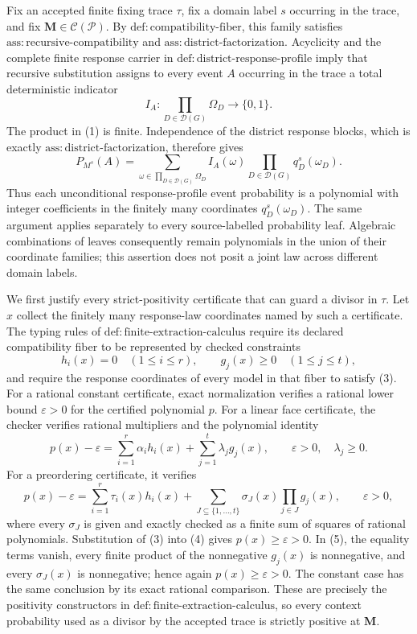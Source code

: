 Fix an accepted finite fixing trace \(\tau\), fix a domain label \(s\) occurring in the trace, and fix \(\mathbf M\in\mathcal C(\mathcal P)\).  By \(\mathrm{def:compatibility\text{-}fiber}\), this family satisfies \(\mathrm{ass:recursive\text{-}compatibility}\) and \(\mathrm{ass:district\text{-}factorization}\).  Acyclicity and the complete finite response carrier in \(\mathrm{def:district\text{-}response\text{-}profile}\) imply that recursive substitution assigns to every event \(A\) occurring in the trace a total deterministic indicator
\[
 I_A:\prod_{D\in\mathcal D(G)}\Omega_D\longrightarrow\{0,1\}.
\tag{1}
\]
The product in (1) is finite.  Independence of the district response blocks, which is exactly \(\mathrm{ass:district\text{-}factorization}\), therefore gives
\[
 P_{M^s}(A)
 =\sum_{\omega\in\prod_{D\in\mathcal D(G)}\Omega_D}
 I_A(\omega)\prod_{D\in\mathcal D(G)}q_D^s(\omega_D).
\tag{2}
\]
Thus each unconditional response-profile event probability is a polynomial with integer coefficients in the finitely many coordinates \(q_D^s(\omega_D)\).  The same argument applies separately to every source-labelled probability leaf.  Algebraic combinations of leaves consequently remain polynomials in the union of their coordinate families; this assertion does not posit a joint law across different domain labels.

We first justify every strict-positivity certificate that can guard a divisor in \(\tau\).  Let \(x\) collect the finitely many response-law coordinates named by such a certificate.  The typing rules of \(\mathrm{def:finite\text{-}extraction\text{-}calculus}\) require its declared compatibility fiber to be represented by checked constraints
\[
 h_i(x)=0\quad(1\le i\le r),
 \qquad
 g_j(x)\ge 0\quad(1\le j\le t),
\tag{3}
\]
and require the response coordinates of every model in that fiber to satisfy (3).  For a rational constant certificate, exact normalization verifies a rational lower bound \(\varepsilon>0\) for the certified polynomial \(p\).  For a linear face certificate, the checker verifies rational multipliers and the polynomial identity
\[
 p(x)-\varepsilon
 =\sum_{i=1}^{r}\alpha_i h_i(x)
  +\sum_{j=1}^{t}\lambda_j g_j(x),
 \qquad \varepsilon>0,\quad \lambda_j\ge0.
\tag{4}
\]
For a preordering certificate, it verifies
\[
 p(x)-\varepsilon
 =\sum_{i=1}^{r}\tau_i(x)h_i(x)
  +\sum_{J\subseteq\{1,\ldots,t\}}
    \sigma_J(x)\prod_{j\in J}g_j(x),
 \qquad \varepsilon>0,
\tag{5}
\]
where every \(\sigma_J\) is given and exactly checked as a finite sum of squares of rational polynomials.  Substitution of (3) into (4) gives \(p(x)\ge\varepsilon>0\).  In (5), the equality terms vanish, every finite product of the nonnegative \(g_j(x)\) is nonnegative, and every \(\sigma_J(x)\) is nonnegative; hence again \(p(x)\ge\varepsilon>0\).  The constant case has the same conclusion by its exact rational comparison.  These are precisely the positivity constructors in \(\mathrm{def:finite\text{-}extraction\text{-}calculus}\), so every context probability used as a divisor by the accepted trace is strictly positive at \(\mathbf M\).

